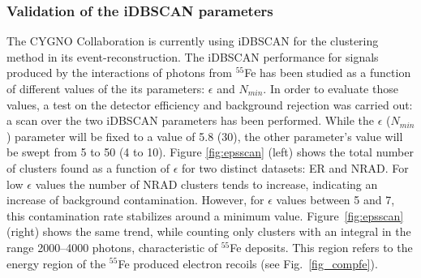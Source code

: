 \documentclass[a4paper,11pt]{article}
\begin{document}

\subsubsection{Validation of the iDBSCAN parameters}

The CYGNO Collaboration is currently using iDBSCAN for the clustering method in its event-reconstruction. The iDBSCAN performance for signals produced by the interactions of photons from $^{55}$Fe has been studied as a function of different values of the its parameters: $\epsilon$ and $N_{min}$.
In order to evaluate those values, a test on the detector efficiency and background rejection was carried out: a scan over the two iDBSCAN parameters has been performed.
While the $\epsilon$ ($N_{min}$) parameter will be fixed to a value of 5.8 (30), the other parameter's value will be swept from 5 to 50 (4 to 10). 
Figure \ref{fig:epsscan} (left) shows the total number of clusters found as a function of $\epsilon$ for two distinct datasets: ER and NRAD.
For low $\epsilon$ values the number of NRAD clusters tends to increase, indicating an increase of background contamination. However, for $\epsilon$ values between 5 and 7, this contamination rate stabilizes around a minimum value.
Figure~\ref{fig:epsscan} (right) shows the same trend, while counting only clusters with an integral in the range 2000–4000 photons, characteristic of $^{55}$Fe deposits. This region refers to the energy region of the $^{55}$Fe produced electron recoils (see Fig.~\ref{fig_compfe}).
\end{document}
